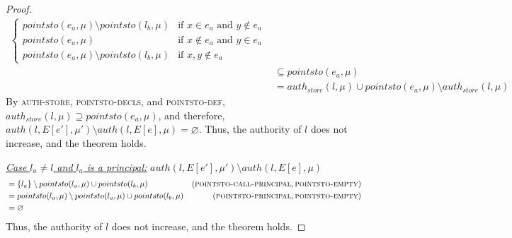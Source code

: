 \documentclass{llncs}
\begin{document}
\begin{proof}
\begin{align*}
\begin{cases}
    pointsto(e_a, \mu) \setminus pointsto(l_b, \mu) & \text{if } x \in e_a\text{ and } y \not\in e_a\\
    pointsto(e_a, \mu) & \text{if } x \not\in e_a \text{ and } y \in e_a\\
    pointsto(e_a, \mu) \setminus pointsto(l_b, \mu) & \text{if } x, y \not\in e_a
\end{cases}\\
&\subseteq pointsto(e_a, \mu)\\
&= auth_{store}(l, \mu) \cup pointsto(e_a, \mu) \setminus auth_{store}(l, \mu)
\end{align*}
By \textsc{auth-store}, \textsc{pointsto-decls}, and \textsc{pointsto-def}, $auth_{store}(l, \mu) \supseteq pointsto(e_a, \mu)$, and therefore, $auth(l, E[e'], \mu') \setminus auth(l, E[e], \mu) = \varnothing$. Thus, the authority of $l$ does not increase, and the theorem holds.

\noindent\underline{\textit{Case $l_a \neq l$ and $l_a$ is a principal:}}
$auth(l, E[e'], \mu') \setminus auth(l, E[e], \mu)$
\vspace{-7pt}
\begin{align*}
&= \{ l_a \} \setminus pointsto(l_a, \mu) \cup pointsto(l_b, \mu) & (\textsc{pointsto-call-principal}, \textsc{pointsto-empty})\\
&= pointsto(l_a, \mu) \setminus pointsto(l_a, \mu) \cup pointsto(l_b, \mu) & (\textsc{pointsto-principal}, \textsc{pointsto-empty})\\
&= \varnothing
\end{align*}
Thus, the authority of $l$ does not increase, and the theorem holds.


\end{proof}
\end{document}
